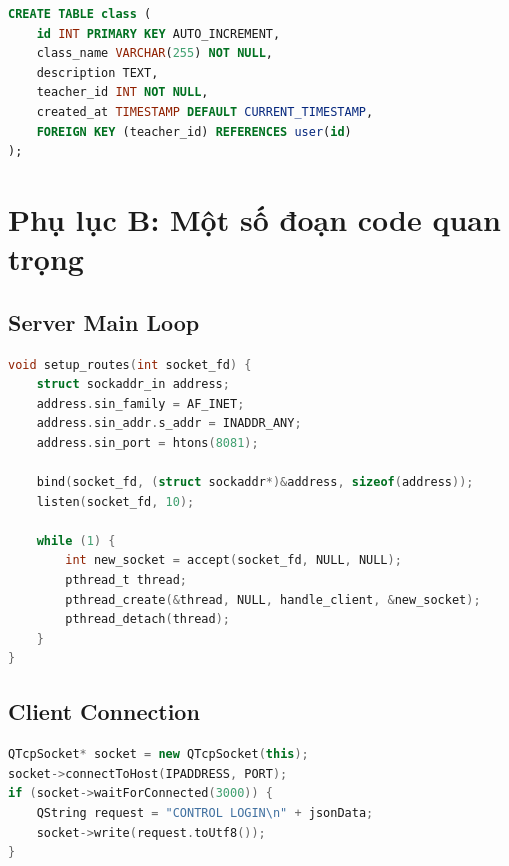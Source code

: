 \documentclass[12pt,a4paper]{report}
\begin{document}
\begin{lstlisting}[language=SQL]
CREATE TABLE class (
    id INT PRIMARY KEY AUTO_INCREMENT,
    class_name VARCHAR(255) NOT NULL,
    description TEXT,
    teacher_id INT NOT NULL,
    created_at TIMESTAMP DEFAULT CURRENT_TIMESTAMP,
    FOREIGN KEY (teacher_id) REFERENCES user(id)
);
\end{lstlisting}

\chapter{Phụ lục B: Một số đoạn code quan trọng}

\section{Server Main Loop}

\begin{lstlisting}[language=C]
void setup_routes(int socket_fd) {
    struct sockaddr_in address;
    address.sin_family = AF_INET;
    address.sin_addr.s_addr = INADDR_ANY;
    address.sin_port = htons(8081);
    
    bind(socket_fd, (struct sockaddr*)&address, sizeof(address));
    listen(socket_fd, 10);
    
    while (1) {
        int new_socket = accept(socket_fd, NULL, NULL);
        pthread_t thread;
        pthread_create(&thread, NULL, handle_client, &new_socket);
        pthread_detach(thread);
    }
}
\end{lstlisting}

\section{Client Connection}

\begin{lstlisting}[language=C++]
QTcpSocket* socket = new QTcpSocket(this);
socket->connectToHost(IPADDRESS, PORT);
if (socket->waitForConnected(3000)) {
    QString request = "CONTROL LOGIN\n" + jsonData;
    socket->write(request.toUtf8());
}
\end{lstlisting}
\end{document}
